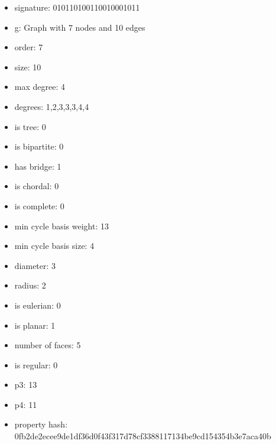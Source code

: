 \begin{itemize}
\item signature: 010110100110010001011
\item g: Graph with 7 nodes and 10 edges
\item order: 7
\item size: 10
\item max degree: 4
\item degrees: 1,2,3,3,3,4,4
\item is tree: 0
\item is bipartite: 0
\item has bridge: 1
\item is chordal: 0
\item is complete: 0
\item min cycle basis weight: 13
\item min cycle basis size: 4
\item diameter: 3
\item radius: 2
\item is eulerian: 0
\item is planar: 1
\item number of faces: 5
\item is regular: 0
\item p3: 13
\item p4: 11
\item property hash: 0fb2de2ecee9de1df36d0f43f317d78cf3388117134be9cd154354b3e7aca40b
\end{itemize}
\newpage
\begin{figure}
\end{figure}
